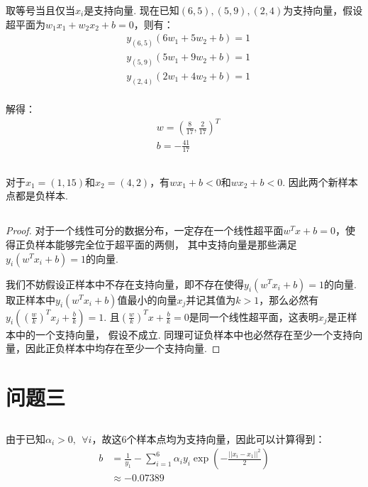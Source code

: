 \documentclass[12pt, a4paper]{article}
\begin{document}
取等号当且仅当$x_i$是支持向量. 现在已知$(6,5),(5,9),(2,4)$为支持向量，假设超平面为$w_1x_1+w_2x_2+b=0$，则有：
\begin{align*}
    &y_{(6,5)}(6w_1+5w_2+b)=1\\
    &y_{(5,9)}(5w_1+9w_2+b)=1\\
    &y_{(2,4)}(2w_1+4w_2+b)=1\\
\end{align*}

解得：
\begin{align*}
    &w=(\frac{8}{17},\frac{2}{17})^T\\
    &b=-\frac{41}{17}
\end{align*}

\subsection{}

对于$x_1=(1,15)$和$x_2=(4,2)$，有$wx_1+b<0$和$wx_2+b<0$. 因此两个新样本点都是负样本. 

\subsection{}

\newtheorem*{proof}{Proof}

\begin{proof}
    对于一个线性可分的数据分布，一定存在一个线性超平面$w^Tx+b=0$，使得正负样本能够完全位于超平面的两侧，
    其中支持向量是那些满足$y_i(w^Tx_i+b)=1$的向量.
    
    我们不妨假设正样本中不存在支持向量，即不存在使得$y_i(w^Tx_i+b)=1$的向量.
    取正样本中$y_i(w^Tx_i+b)$值最小的向量$x_j$并记其值为$k>1$，那么必然有$y_i((\frac{w}{k})^Tx_j+\frac{b}{k})=1$.
    且$(\frac{w}{k})^Tx+\frac{b}{k}=0$是同一个线性超平面，这表明$x_j$是正样本中的一个支持向量，
    假设不成立. 同理可证负样本中也必然存在至少一个支持向量，因此正负样本中均存在至少一个支持向量.
\end{proof}


\section{问题三}


\subsection{}

由于已知$\alpha_i > 0, \ \ \forall i$，故这6个样本点均为支持向量，因此可以计算得到：
\begin{align*}
    b&=\frac{1}{y_1}-\sum_{i=1}^{6}\alpha_i y_i \exp(-\frac{||x_i-x_1||^2}{2}) \\
    &\approx -0.07389
\end{align*}
\end{document}
